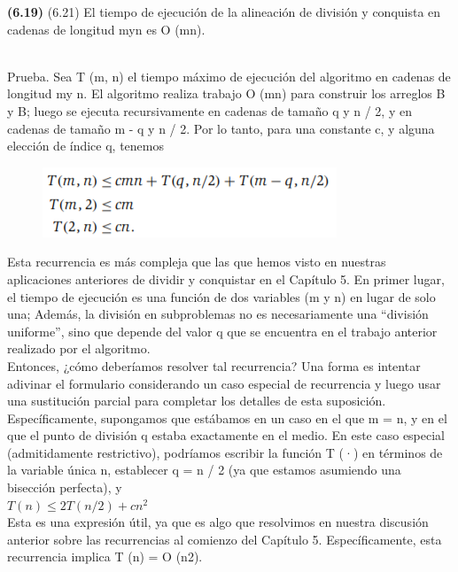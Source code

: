 \documentclass[a4paper, 12pt]{book}
\theoremstyle{dotless}
\begin{document}
\colorbox{mygray}{\parbox{15cm}{
\textbf{(6.19)} (6.21) El tiempo de ejecución de la alineación de división y conquista en cadenas de longitud myn es O (mn).}}\\

Prueba. Sea T (m, n) el tiempo máximo de ejecución del algoritmo en cadenas de longitud my n. El algoritmo realiza trabajo O (mn) para construir los arreglos B y B; luego se ejecuta recursivamente en cadenas de tamaño q y n / 2, y en cadenas de tamaño m - q y n / 2. Por lo tanto, para una constante c, y alguna elección de índice q, tenemos\\

\begin{figure}[h]
\centering
\includegraphics[scale=1]{Imagenes-Seccion6/form6_2.PNG}
\end{figure}

Esta recurrencia es más compleja que las que hemos visto en nuestras aplicaciones anteriores de dividir y conquistar en el Capítulo 5. En primer lugar, el tiempo de ejecución es una función de dos variables (m y n) en lugar de solo una; Además, la división en subproblemas no es necesariamente una ``división uniforme'', sino que depende del valor q que se encuentra en el trabajo anterior realizado por el algoritmo.\\

Entonces, ¿cómo deberíamos resolver tal recurrencia? Una forma es intentar adivinar el formulario considerando un caso especial de recurrencia y luego usar una sustitución parcial para completar los detalles de esta suposición. Específicamente, supongamos que estábamos en un caso en el que m = n, y en el que el punto de división q estaba exactamente en el medio. En este caso especial (admitidamente restrictivo), podríamos escribir la función T (·) en términos de la variable única n, establecer q = n / 2 (ya que estamos asumiendo una bisección perfecta), y\\

$T(n) ≤ 2T(n/2) + cn^2$\\

Esta es una expresión útil, ya que es algo que resolvimos en nuestra discusión anterior sobre las recurrencias al comienzo del Capítulo 5. Específicamente, esta recurrencia implica T (n) = O (n2).\\
\end{document}
